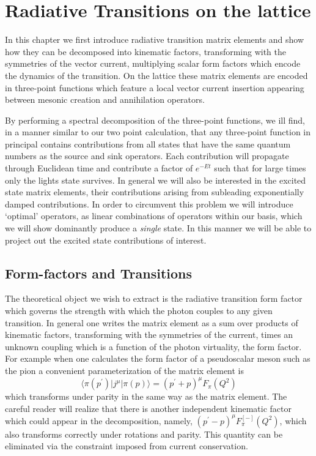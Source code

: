 \chapter{Radiative Transitions on the lattice} \label{chap::radTranLattice}

In this chapter we first introduce radiative transition matrix elements and show how they can be decomposed into kinematic factors, transforming with the symmetries of the vector current, multiplying scalar form factors which encode the dynamics of the transition. On the lattice these matrix elements are encoded in three-point functions which feature a local vector current insertion appearing between mesonic creation and annihilation operators. 

By performing a spectral decomposition of the three-point functions, we ill find, in a manner similar to our two point calculation,  that any three-point function in principal contains contributions from all states that have the same quantum numbers as the source and sink operators. Each contribution will propagate through Euclidean time and contribute a factor of $e^{-Et}$ such that for large times only the lights state survives. In general we will also be interested in the excited state matrix elements, their contributions arising from subleading exponentially damped contributions. In order to circumvent this problem we will introduce `optimal' operators, as linear combinations of operators within our basis, which we will show dominantly produce a \emph{single} state. In this manner we will be able to project out the excited state contributions of interest. 


\section{Form-factors and Transitions \label{sec::formfactor}}


 The theoretical object we wish to extract is the radiative transition form factor which governs the strength with which the photon couples to any given transition. In general one writes the matrix element as a sum over products of kinematic factors, transforming with the symmetries of the current, times an unknown coupling which is a function of the photon virtuality, the form factor. For example when one calculates the form factor of a pseudoscalar meson such as the pion a convenient parameterization of the matrix element is 
\begin{equation*}
\langle \pi (p^\prime) | j^\mu | \pi (p) \rangle = \left( p^\prime + p\right)^\mu F_\pi(Q^2)
\end{equation*}
which transforms under parity in the same way as the matrix element. The careful reader will realize that there is another independent kinematic factor which could appear in the decomposition, namely, $  \left( p^\prime - p\right)^\mu F^{[-]}_\pi(Q^2) $, which also transforms correctly under rotations and parity. This quantity can be eliminated via the constraint imposed from current conservation.

